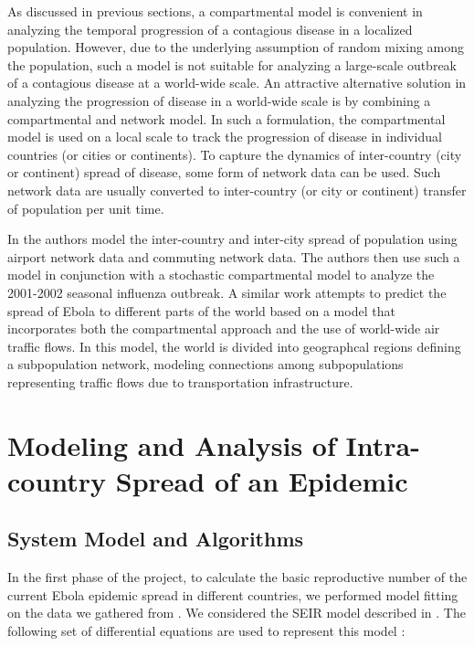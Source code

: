 \documentclass[10pt, journal,onecolumn]{IEEEtran}
\begin{document}
As discussed in previous sections, a compartmental model is convenient in analyzing the temporal
progression of a contagious disease in a localized population. However, due to the underlying
assumption of random mixing among the population, such a model is not suitable for analyzing a large-scale
outbreak of a contagious disease at a world-wide scale. An attractive alternative solution in
analyzing the progression of disease in a world-wide scale is by combining a compartmental and
network model. In such a formulation, the compartmental model is used on a local scale to track the
progression of disease in individual countries (or cities or continents). To capture the dynamics of
inter-country (city or continent) spread of disease, some form of network data can be used. Such
network data are usually converted to inter-country (or city or continent) transfer of population per
unit time.

In \citep{balcan2010modeling} the authors model the inter-country and inter-city spread of
population using airport network data and commuting network data. The authors then use such a model in
conjunction with a stochastic compartmental model to analyze the 2001-2002 seasonal influenza
outbreak. A similar work \citep{gomes2014assessing} attempts to predict the spread of Ebola to
different parts of the world based on a model that incorporates both the compartmental approach and
the use of world-wide air traffic flows. In this model, the world is divided into geographcal
regions defining a subpopulation network, modeling connections among subpopulations representing
traffic flows due to transportation infrastructure.



\section{{Modeling and Analysis of Intra-country Spread of an Epidemic}}
\label{sec:IntraCountry}

\subsection{System Model and Algorithms}
In the first phase of the project, to calculate the basic reproductive number of the current Ebola
epidemic spread in different countries, we performed model fitting on the data we gathered from
\citep{cmriversdata}. We considered the SEIR model described in \citep{chowell2004basic}. The
following set of differential equations are used to represent this model \citep{chowell2004basic}:
\end{document}
